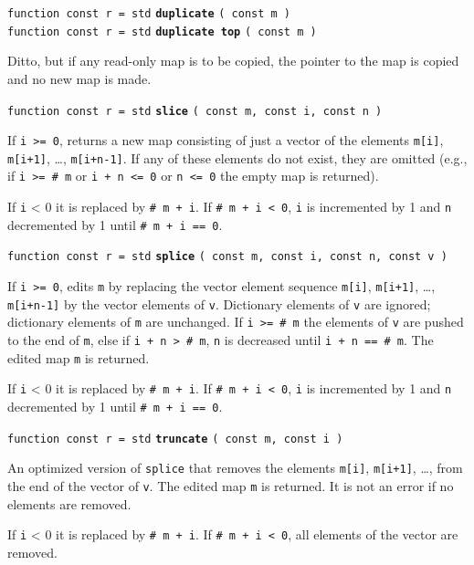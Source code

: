 \documentclass[12pt]{article}
\newcommand{\ttkey}[1]{{\tt \bfseries #1}}
\newenvironment{indpar}[1][0.3in]%
	{\begin{list}{}%
		     {\setlength{\itemsep}{0in}%
		      \setlength{\topsep}{0in}%
		      \setlength{\parsep}{1ex}%
		      \setlength{\labelwidth}{#1}%
		      \setlength{\leftmargin}{#1}%
		      \addtolength{\leftmargin}{\labelsep}}%
	 \item}%
	{\end{list}}
\begin{document}
{\tt function const r = std} \ttkey{duplicate} {\tt ( const m )} \\
{\tt function const r = std} \ttkey{duplicate top} {\tt ( const m )}
\begin{indpar}
Ditto, but if any read-only map is to be copied, the pointer
to the map is copied and no new map is made.
\end{indpar}

{\tt function const r = std} \ttkey{slice} {\tt ( const m, const i, const n )}
\begin{indpar}
If {\tt i >= 0}, returns a new map consisting of just a vector of the
elements {\tt m[i]}, {\tt m[i+1]}, \ldots, {\tt m[i+n-1]}.  
If any of these elements do not exist, they are omitted (e.g.,
if {\tt i >= \# m} or {\tt i + n <= 0} or {\tt n <= 0}
the empty map is returned).

If {\tt i} < 0 it is replaced by {\tt \# m + i}.  If {\tt \# m + i < 0},
{\tt i} is incremented by 1 and {\tt n} decremented by 1 until 
{\tt \# m + i == 0}.
\end{indpar}

{\tt function const r = std} \ttkey{splice}
    {\tt ( const m, const i, const n, const v )}
\begin{indpar}
If {\tt i >= 0}, edits {\tt m} by replacing the vector element sequence
{\tt m[i]}, {\tt m[i+1]}, \ldots, {\tt m[i+n-1]} by the
vector elements of {\tt v}.  Dictionary elements of {\tt v} are ignored;
dictionary elements of {\tt m} are unchanged.
If {\tt i >= \# m} the elements of {\tt v} are pushed to the end of {\tt m},
else if {\tt i + n > \# m}, {\tt n} is decreased until {\tt i + n == \# m}.
The edited map {\tt m} is returned.

If {\tt i} < 0 it is replaced by {\tt \# m + i}.  If {\tt \# m + i < 0},
{\tt i} is incremented by 1 and {\tt n} decremented by 1 until 
{\tt \# m + i == 0}.
\end{indpar}

{\tt function const r = std} \ttkey{truncate} {\tt ( const m, const i )}
\begin{indpar}
An optimized version of {\tt splice} that removes the elements
{\tt m[i]}, {\tt m[i+1]}, \ldots, from the end of the vector of {\tt v}.
The edited map {\tt m} is returned.  It is not an error if no elements
are removed.

If {\tt i} < 0 it is replaced by {\tt \# m + i}.  If {\tt \# m + i < 0},
all elements of the vector are removed.
\end{indpar}
\end{document}
